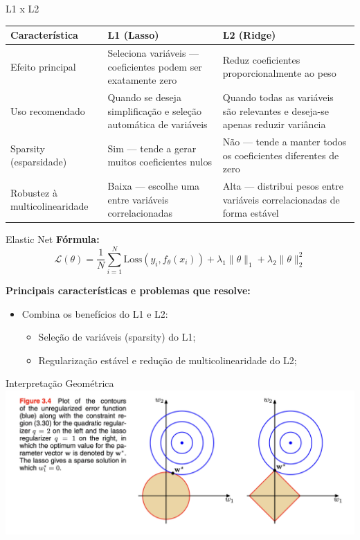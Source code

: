 \documentclass{beamer}
\begin{document}
\begin{frame}{L1 x L2}
\scriptsize
\begin{tabularx}{\textwidth}{|l|X|X|}
    \hline
    \textbf{Característica} & \textbf{L1 (Lasso)} & \textbf{L2 (Ridge)} \\ \hline
    Efeito principal & Seleciona variáveis — coeficientes podem ser exatamente zero & Reduz coeficientes proporcionalmente ao peso \\ \hline
    Uso recomendado & Quando se deseja simplificação e seleção automática de variáveis & Quando todas as variáveis são relevantes e deseja-se apenas reduzir variância \\ \hline
    Sparsity (esparsidade) & Sim — tende a gerar muitos coeficientes nulos & Não — tende a manter todos os coeficientes diferentes de zero \\ \hline
    Robustez à multicolinearidade & Baixa — escolhe uma entre variáveis correlacionadas & Alta — distribui pesos entre variáveis correlacionadas de forma estável \\ \hline
\end{tabularx}
\end{frame}






\begin{frame}{Elastic Net}
    \textbf{Fórmula:}
    \[
    \mathcal{L}(\theta) = \frac{1}{N}\sum_{i=1}^{N} \text{Loss}(y_i, f_\theta(x_i)) + \lambda_1 \|\theta\|_1 + \lambda_2 \|\theta\|_2^2
    \]

    \vspace{0.5cm}
    \textbf{Principais características e problemas que resolve:}
    \begin{itemize}
        \item Combina os benefícios do L1 e L2:
        \begin{itemize}
            \item Seleção de variáveis (sparsity) do L1;
            \item Regularização estável e redução de multicolinearidade do L2;
        \end{itemize}
    \end{itemize}
\end{frame}



\begin{frame}{Interpretação Geométrica}
\centering
\includegraphics[width=\textwidth,height=0.8\textheight,keepaspectratio]{imgs/bishop_example/7.png}
\end{frame}
\end{document}
